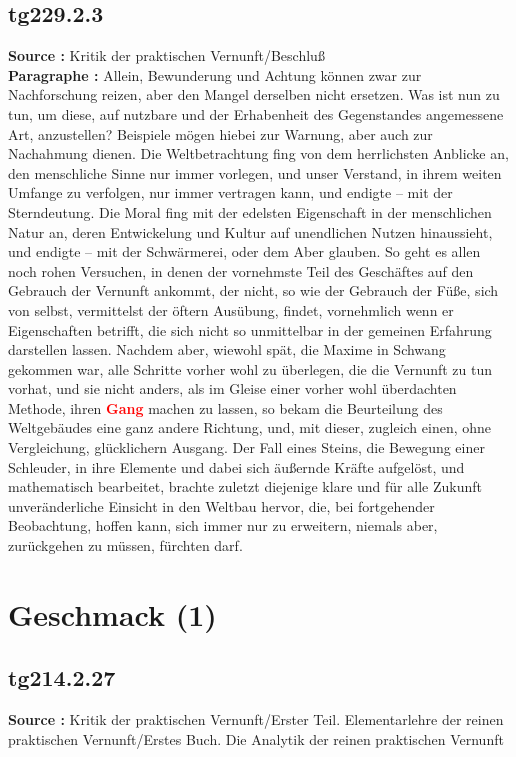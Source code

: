 \documentclass[a4paper,12pt,twoside]{book}
\newcommand{\match}[1]{\textcolor{red}{\textbf{#1}}}
\newcommand{\unnumberedsection}[1]{
	\section*{#1}
	\addcontentsline{toc}{section}{#1}
	\markright{#1}
}
\begin{document}
	\subsection*{tg229.2.3} 
	\textbf{Source : }Kritik der praktischen Vernunft/Beschluß\\  
	
	\noindent\textbf{Paragraphe : }Allein, Bewunderung und Achtung können zwar zur Nachforschung reizen, aber den Mangel derselben nicht ersetzen.  Was ist nun zu tun, um diese, auf nutzbare und der Erhabenheit des Gegenstandes angemessene Art, anzustellen? Beispiele mögen hiebei zur Warnung, aber auch zur Nachahmung dienen. Die Weltbetrachtung fing von dem herrlichsten Anblicke an, den menschliche Sinne nur immer vorlegen, und unser Verstand, in ihrem weiten Umfange zu verfolgen, nur immer vertragen kann, und endigte – mit der Sterndeutung. Die Moral fing mit der edelsten Eigenschaft in der menschlichen Natur an, deren Entwickelung und Kultur auf unendlichen Nutzen hinaussieht, und endigte – mit der Schwärmerei, oder dem Aber glauben. So geht es allen noch rohen Versuchen, in denen der vornehmste Teil des Geschäftes auf den Gebrauch der Vernunft ankommt, der nicht, so wie der Gebrauch der Füße, sich von selbst, vermittelst der öftern Ausübung, findet, vornehmlich wenn er Eigenschaften betrifft, die sich nicht so unmittelbar in der gemeinen Erfahrung darstellen lassen. Nachdem aber, wiewohl spät, die Maxime in Schwang gekommen war, alle Schritte vorher wohl zu überlegen, die die Vernunft zu tun vorhat, und sie nicht anders, als im Gleise einer vorher wohl überdachten Methode, ihren \match{Gang} machen zu lassen, so bekam die Beurteilung des Weltgebäudes eine ganz andere Richtung, und, mit dieser, zugleich einen, ohne Vergleichung, glücklichern Ausgang. Der Fall eines Steins, die Bewegung einer Schleuder, in ihre Elemente und dabei sich äußernde Kräfte aufgelöst, und mathematisch bearbeitet, brachte zuletzt diejenige klare und für alle Zukunft unveränderliche Einsicht in den Weltbau hervor, die, bei fortgehender Beobachtung, hoffen kann, sich immer nur zu erweitern, niemals aber, zurückgehen zu müssen, fürchten darf. 
	
	\unnumberedsection{Geschmack (1)} 
	\subsection*{tg214.2.27} 
	\textbf{Source : }Kritik der praktischen Vernunft/Erster Teil. Elementarlehre der reinen praktischen Vernunft/Erstes Buch. Die Analytik der reinen praktischen Vernunft\\  
	
\end{document}
